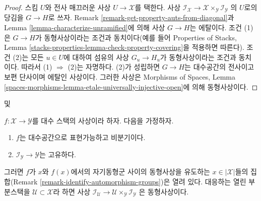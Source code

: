 \begin{proof}
스킴 $U$와 전사 매끄러운 사상 $U \to \mathcal{X}$를 택한다. 사상
$\mathcal{I}_\mathcal{X} \to
\mathcal{X} \times_\mathcal{Y} \mathcal{I}_\mathcal{Y}$
의 $U$로의 당김을 $G \to H$로 쓰자. Remark
\ref{remark-get-property-auts-from-diagonal}과 Lemma
\ref{lemma-characterize-unramified}에 의해 사상 $G \to H$는 에탈이다.
조건 (1)은 $G \to H$가 동형사상이라는 조건과 동치이다(예를 들어
Properties of Stacks, Lemma
\ref{stacks-properties-lemma-check-property-covering}을 적용하면 따른다).
조건 (2)는 모든 $u \in U$에 대하여 섬유의 사상 $G_u \to H_u$가
동형사상이라는 조건과 동치이다. 따라서 (1) $\Rightarrow$ (2)는
자명하다. (2)가 성립하면 $G \to H$는 대수공간의 전사이고 보편 단사이며
에탈인 사상이다. 그러한 사상은 Morphisms of Spaces, Lemma
\ref{spaces-morphisms-lemma-etale-universally-injective-open}에 의해
동형사상이다.
\end{proof}

\begin{lemma}
\label{lemma-stabilizer-preserving-unramified}
\begin{reference}
\cite[Proposition 3.5]{rydh_quotients} 및
\cite[Proposition 2.5]{alper_quotient}
\end{reference}
$f : \mathcal{X} \to \mathcal{Y}$를 대수 스택의 사상이라 하자. 다음을
가정하자.
\begin{enumerate}
\item $f$는 대수공간으로 표현가능하고 비분기이다.
\item $\mathcal{I}_\mathcal{Y} \to \mathcal{Y}$는 고유하다.
\end{enumerate}
그러면 $f$가 $x$와 $f(x)$에서의 자기동형군 사이의 동형사상을 유도하는
$x \in |\mathcal{X}|$들의 집합(Remark
\ref{remark-identify-automorphism-groups})은 열려 있다. 대응하는 열린
부분스택을 $\mathcal{U} \subset \mathcal{X}$라 하면 사상
$\mathcal{I}_\mathcal{U} \to
\mathcal{U} \times_\mathcal{Y} \mathcal{I}_\mathcal{Y}$
은 동형사상이다.
\end{lemma}


